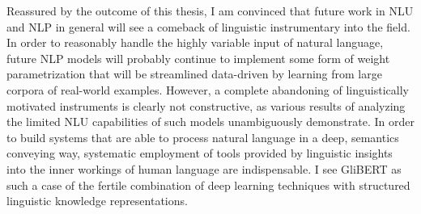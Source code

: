 Reassured by the outcome of this thesis, I am convinced that future work in NLU and
NLP in general will see a comeback of linguistic instrumentary into the field. In
order to reasonably handle the highly variable input of natural language, future NLP
models will probably continue to implement some form of weight parametrization that
will be streamlined data-driven by learning from large corpora of real-world examples.
However, a complete abandoning of linguistically motivated instruments is clearly not
constructive, as various results of analyzing the limited NLU capabilities of
such models unambiguously demonstrate. In order to build systems that are able
to process natural language in a deep, semantics conveying way, systematic employment
of tools provided by linguistic insights into the inner workings of human language
are indispensable. I see GliBERT as such a case of the fertile combination of deep
learning techniques with structured linguistic knowledge representations.


